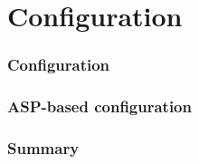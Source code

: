 \part{Configuration}
\section{Configuration}

\section{ASP-based configuration}

\section{Summary}

%
